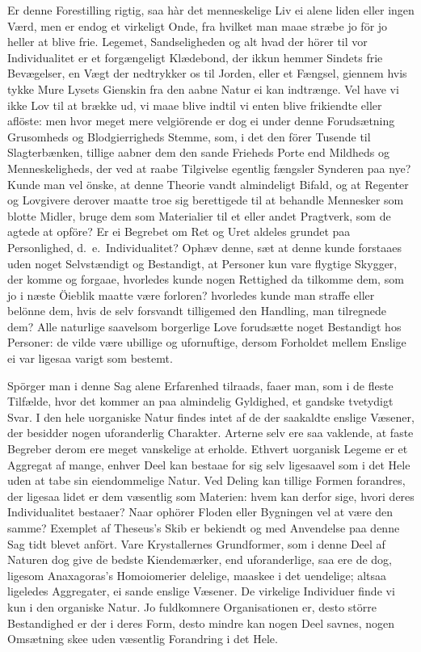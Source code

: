 \documentclass[12pt,a4paper]{article}
\newcommand{\opage}[1]{\marginnote{\footnotesize\textit{[#1]}}}
\begin{document}
Er denne Forestilling rigtig, saa hàr det menneskelige Liv ei alene liden
eller ingen Værd, men er endog et virkeligt Onde, fra hvilket man maae
stræbe jo för jo heller at blive frie. Legemet, Sandseligheden og alt hvad
der hörer til vor Individualitet er et forgængeligt Klædebond, der ikkun
hemmer Sindets frie
\opage{232} Bevægelser, en Vægt der nedtrykker os til Jorden, eller et Fængsel,
giennem hvis tykke Mure Lysets Gienskin fra den aabne Natur ei kan
indtrænge. Vel have vi ikke Lov til at brække ud, vi maae blive indtil vi
enten blive frikiendte eller aflöste: men hvor meget mere velgiörende er
dog ei under denne Forudsætning Grusomheds og Blodgierrigheds Stemme, som,
i det den förer Tusende til Slagterbænken, tillige aabner dem den sande
Frieheds Porte end Mildheds og Menneskeligheds, der ved at raabe Tilgivelse
egentlig fængsler Synderen paa nye? Kunde man vel önske, at denne Theorie
vandt almindeligt Bifald, og at Regenter og Lovgivere derover maatte troe
sig berettigede til at behandle Mennesker som blotte Midler, bruge dem som
Materialier til et eller andet Pragtverk, som de agtede at opföre? Er ei
Begrebet om Ret og Uret aldeles grundet paa Personlighed, d.~e.\
Individualitet? Ophæv denne, sæt at denne kunde forstaaes uden noget
Selvstændigt og Bestandigt, at Personer kun vare flygtige Skygger, der
komme og forgaae, hvorledes kunde nogen Rettighed da tilkomme dem, som jo
i næste Öieblik maatte være forloren? hvorledes kunde man straffe eller
belönne dem, hvis de selv forsvandt tilligemed den Handling, man tilregnede
dem? Alle naturlige saavelsom borgerlige Love forudsætte noget Bestandigt
hos Personer: de vilde være ubillige og ufornuftige, dersom Forholdet
mellem Enslige ei var ligesaa varigt som bestemt.

Spörger man i denne Sag alene Erfarenhed tilraads, faaer man, som i de
fleste Tilfælde, hvor det kommer an paa almindelig Gyldighed, et gandske
tvetydigt Svar. I den hele uorganiske Natur findes intet af de der
saakaldte enslige Væsener, der
\opage{233} besidder nogen uforanderlig Charakter. Arterne selv ere saa vaklende, at
faste Begreber derom ere meget vanskelige at erholde. Ethvert uorganisk
Legeme er et Aggregat af mange, enhver Deel kan bestaae for sig selv
ligesaavel som i det Hele uden at tabe sin eiendommelige Natur. Ved Deling
kan tillige Formen forandres, der ligesaa lidet er dem væsentlig som
Materien: hvem kan derfor sige, hvori deres Individualitet bestaaer? Naar
ophörer Floden eller Bygningen vel at være den samme? Exemplet af
Theseus's Skib er bekiendt og med Anvendelse paa denne Sag tidt blevet
anfört. Vare Krystallernes Grundformer, som i denne Deel af Naturen dog
give de bedste Kiendemærker, end uforanderlige, saa ere de dog, ligesom
Anaxagoras's Homoiomerier delelige, maaskee i det uendelige; altsaa
ligeledes Aggregater, ei sande enslige Væsener. De virkelige Individuer
finde vi kun i den organiske Natur. Jo fuldkomnere Organisationen er,
desto större Bestandighed er der i deres Form, desto mindre kan nogen Deel
savnes, nogen Omsætning skee uden væsentlig Forandring i det Hele.
\end{document}
